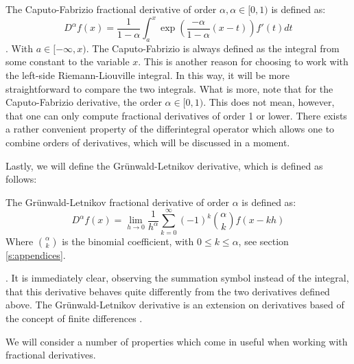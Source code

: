 \begin{definition}\label{d: CF}
    The Caputo-Fabrizio fractional derivative of order \(\alpha, \alpha \in [0,1)\) is defined as:
    \begin{equation}
        D^{\alpha} f(x) = \frac{1}{1 - \alpha}  \int_{a}^{x} \exp\left(\frac{-\alpha}{1 - \alpha}(x-t)\right) f'(t) dt
    \end{equation} \cite{caputo2015}.
    With \(a \in [-\infty, x)\).
    The Caputo-Fabrizio is always defined as the integral from some constant to the variable \(x\). This is another reason for choosing to work with the left-side Riemann-Liouville integral. In this way, it will be more straightforward to compare the two integrals. What is more, note that for the Caputo-Fabrizio derivative, the order \(\alpha \in [0, 1)\). This does not mean, however, that one can only compute fractional derivatives of order 1 or lower. There exists a rather convenient property of the differintegral operator which allows one to combine orders of derivatives, which will be discussed in a moment.
    
\end{definition}

Lastly, we will define the Grünwald-Letnikov derivative, which is defined as follows:
\begin{definition}
    The Grünwald-Letnikov fractional derivative of order \(\alpha\) is defined as:
    \begin{equation}
        D^\alpha f(x) = \lim_{h \to 0} \frac{1}{h^\alpha} \sum_{k=0}^\infty (-1)^k \binom{\alpha}{k} f(x - k h)
    \end{equation}
   Where \(\binom{\alpha}{k}\) is the binomial coefficient, with \(0 \leq k \leq \alpha\), see section \autoref{s:appendices}.
\end{definition} \cite{zhmakin2022}.
It is immediately clear, observing the summation symbol instead of the integral, that this derivative behaves quite differently from the two derivatives defined above. The Grünwald-Letnikov derivative is an extension on derivatives based of the concept of finite differences \cite{flajolet1995}.

We will consider a number of properties which come in useful when working with fractional derivatives.

